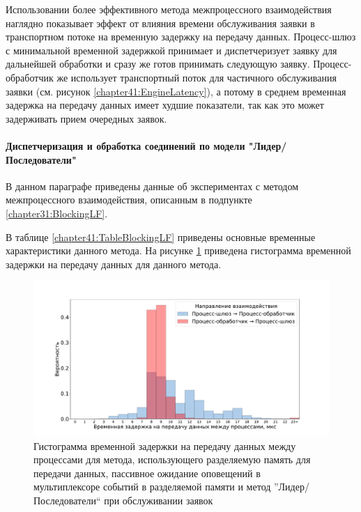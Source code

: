 Использовании более эффективного метода межпроцессного взаимодействия наглядно показывает эффект от влияния времени обслуживания заявки в транспортном потоке на временную задержку на передачу данных. Процесс-шлюз с минимальной временной задержкой принимает и диспетчеризует заявку для дальнейшей обработки и сразу же готов принимать следующую заявку. Процесс-обработчик же использует транспортный поток для частичного обслуживания заявки (см. рисунок \ref{chapter41:EngineLatency}), а потому в среднем временная задержка на передачу данных имеет худшие показатели, так как это может задерживать прием очередных заявок.

\paragraph{Диспетчеризация и обработка соединений по модели "Лидер/Последователи"}

В данном параграфе приведены данные об экспериментах с методом межпроцессного взаимодействия, описанным в подпункте \ref{chapter31:BlockingLF}.

В таблице \ref{chapter41:TableBlockingLF} приведены основные временные характеристики данного метода.
На рисунке \ref{chapter41:FigBlockingLF} приведена гистограмма временной задержки на передачу данных для данного метода.

\begin{figure}[!h]
\caption{Гистограмма временной задержки на передачу данных между процессами для метода, использующего разделяемую память для передачи данных, пассивное ожидание оповещений в мультиплексоре событий в разделяемой памяти и метод ''Лидер/Последователи`` при обслуживании заявок}
\label{chapter41:FigBlockingLF}
\includegraphics[width=\textwidth]{../../graphics/hist/BlockingLF}
\end{figure}

